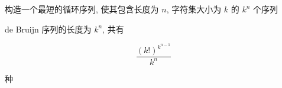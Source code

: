 构造一个最短的循环序列, 使其包含长度为 \(n\), 字符集大小为 \(k\) 的 \(k^n\) 个序列

de Bruijn 序列的长度为 \(k^n\), 共有

\[
    \frac{\left(k!\right)^{k^{n-1}}}{k^n}
\]

种
